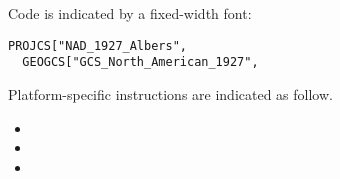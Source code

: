 Code is indicated by a fixed-width font:
\begin{verbatim}
PROJCS["NAD_1927_Albers",
  GEOGCS["GCS_North_American_1927",
\end{verbatim}

Platform-specific instructions are indicated as follow.
\begin{itemize}
\item {} 
\item {} 
\item {}
\end{itemize} 





